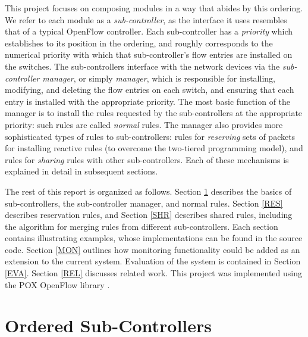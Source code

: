 \documentclass{article}
\begin{document}
This project focuses on composing modules in a way that abides by
this ordering. 
We refer to each module as a \emph{sub-controller}, as the interface it uses
resembles that of a typical OpenFlow controller.
Each sub-controller has a \emph{priority} which establishes to its position
in the ordering, and roughly corresponds to the numerical priority with
which that sub-controller's flow entries are installed on the switches.
The sub-controllers interface with the network devices via the
\emph{sub-controller manager}, or simply \emph{manager}, which is responsible
for installing, modifying, and deleting the flow entries on each switch, and 
ensuring that each entry is installed with the appropriate priority.
The most basic function of the manager is to install the rules requested
by the sub-controllers at the appropriate priority: such rules are called
\emph{normal} rules.
The manager also provides more sophisticated types of rules to sub-controllers: 
rules for \emph{reserving} sets of packets for installing reactive rules 
(to overcome the two-tiered programming model),
and rules for \emph{sharing} rules with other sub-controllers. 
Each of these mechanisms is explained in detail in subsequent sections. 

The rest of this report is organized as follows. 
Section \ref{ORD} describes the basics of sub-controllers, 
the sub-controller manager, and normal rules. 
Section \ref{RES} describes reservation rules, and Section \ref{SHR} describes
shared rules, including the algorithm for merging rules from different 
sub-controllers. 
Each section contains illustrating examples, whose implementations can be 
found in the source code.
Section \ref{MON} outlines how monitoring functionality could be 
added as an extension to the current system. 
Evaluation of the system is contained in Section \ref{EVA}.
Section \ref{REL} discusses related work.
This project was implemented using the POX OpenFlow library \cite{pox}.

\section{Ordered Sub-Controllers} \label{ORD}
\end{document}
